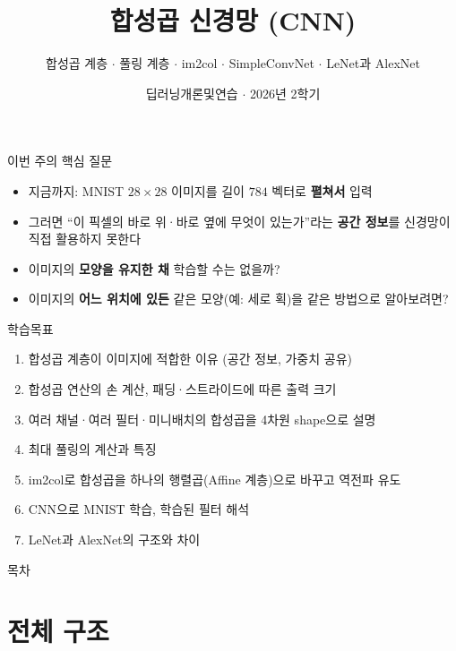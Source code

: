 \documentclass[aspectratio=169,11pt]{beamer}
\title{합성곱 신경망 (CNN)}
\subtitle{합성곱 계층 $\cdot$ 풀링 계층 $\cdot$ im2col $\cdot$ SimpleConvNet $\cdot$ LeNet과 AlexNet}
\date{딥러닝개론및연습 $\cdot$ 2026년 2학기}
\begin{document}
\begin{frame}[plain]
\titlepage
\end{frame}

\begin{frame}{이번 주의 핵심 질문}
\begin{keybox}[이번 주의 핵심 질문]
\begin{itemize}
\item 지금까지: MNIST $28\times28$ 이미지를 길이 $784$ 벡터로 \textbf{펼쳐서} 입력
\item 그러면 ``이 픽셀의 바로 위·바로 옆에 무엇이 있는가''라는 \textbf{공간 정보}를 신경망이 직접 활용하지 못한다
\item 이미지의 \textbf{모양을 유지한 채} 학습할 수는 없을까?
\item 이미지의 \textbf{어느 위치에 있든} 같은 모양(예: 세로 획)을 같은 방법으로 알아보려면?
\end{itemize}
\end{keybox}
\end{frame}

\begin{frame}{학습목표}
\begin{enumerate}
\item 합성곱 계층이 이미지에 적합한 이유 (공간 정보, 가중치 공유)
\item 합성곱 연산의 손 계산, 패딩·스트라이드에 따른 출력 크기
\item 여러 채널·여러 필터·미니배치의 합성곱을 4차원 shape으로 설명
\item 최대 풀링의 계산과 특징
\item im2col로 합성곱을 하나의 행렬곱(Affine 계층)으로 바꾸고 역전파 유도
\item CNN으로 MNIST 학습, 학습된 필터 해석
\item LeNet과 AlexNet의 구조와 차이
\end{enumerate}
\end{frame}

\begin{frame}{목차}
\small
\tableofcontents
\end{frame}

\section{전체 구조}
\end{document}

